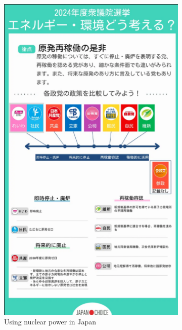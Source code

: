\documentclass[final,5p,times,twocolumn,authoryear]{elsarticle}
\begin{document}
\begin{figure}[ht]
\begin{subfigure}[t]{0.22\textwidth}
        \includegraphics[width=\linewidth]{figs/mielka/nuclear.png}
        \caption{Using nuclear power in Japan}
        \label{fig:nuclear}
    \end{subfigure}\hfill
    \begin{subfigure}[t]{0.22\textwidth}
        \centering

\end{subfigure}
\end{figure}
\end{document}
